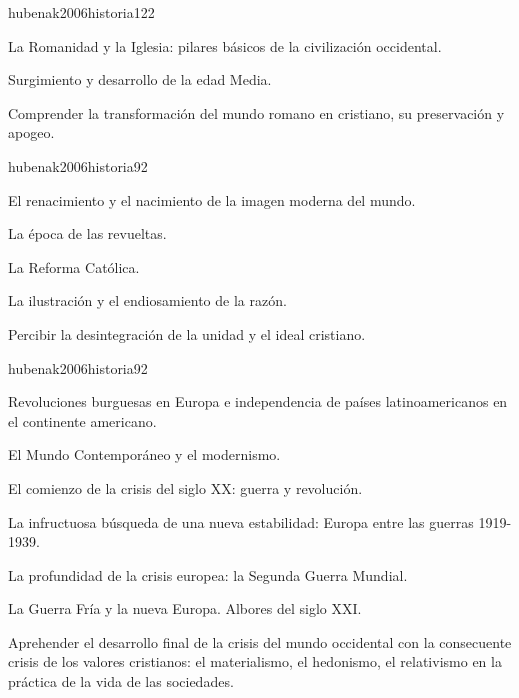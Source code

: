 \begin{syllabus}
\begin{unit}{}{hubenak2006historia}{12}{2}
\begin{topics}
	\item La Romanidad y la Iglesia: pilares básicos de la civilización occidental. 	
	\item Surgimiento y desarrollo de la edad Media.
\end{topics}
\begin{unitgoals}
	\item Comprender la transformación del mundo romano en cristiano, su preservación y apogeo.
\end{unitgoals}
\end{unit}

\begin{unit}{}{hubenak2006historia}{9}{2}
\begin{topics}
	\item El renacimiento y el nacimiento de la imagen moderna del mundo.  	
	\item La época de las revueltas. 	
	\item La Reforma Católica. 	
	\item La ilustración y el endiosamiento de la razón. 
\end{topics}
\begin{unitgoals}
	\item Percibir la desintegración de la unidad y el ideal cristiano.
\end{unitgoals}
\end{unit}

\begin{unit}{}{hubenak2006historia}{9}{2}
\begin{topics}
	\item Revoluciones burguesas en Europa e independencia de países latinoamericanos en el continente americano. 	
	\item El Mundo Contemporáneo y el modernismo. 	
	\item El comienzo de la crisis del siglo XX: guerra y revolución. 	
	\item La infructuosa búsqueda de una nueva estabilidad: Europa entre las guerras 1919-1939. 	
	\item La profundidad de la crisis europea: la Segunda Guerra Mundial. 	
	\item La Guerra Fría y la nueva Europa. Albores del siglo XXI.
\end{topics}
\begin{unitgoals}
	\item Aprehender el desarrollo final de la crisis del mundo occidental con la consecuente crisis de los valores cristianos: el materialismo, el hedonismo, el relativismo en la práctica de la vida de las sociedades. 
\end{unitgoals}
\end{unit}


\end{syllabus}
